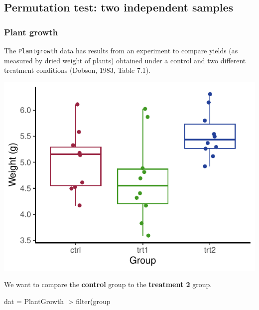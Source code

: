 \documentclass[a4paper]{article}
\begin{document}
\subsection{Permutation test: two independent samples}
\subsubsection{Plant growth}
The \lstinline|Plantgrowth| data has results from an experiment to compare yields (as measured by dried weight of plants) obtained under a control and two different treatment conditions (Dobson, 1983, Table 7.1).
\begin{Schunk}


{\centering \includegraphics[width=\maxwidth]{figure/listings-unnamed-chunk-137-1} 

}

\end{Schunk}
We want to compare the \textbf{control} group to the \textbf{treatment 2} group.
\begin{Schunk}
\begin{Sinput}
dat = PlantGrowth |> filter(group %
\end{Sinput}
\end{Schunk}
\end{document}
